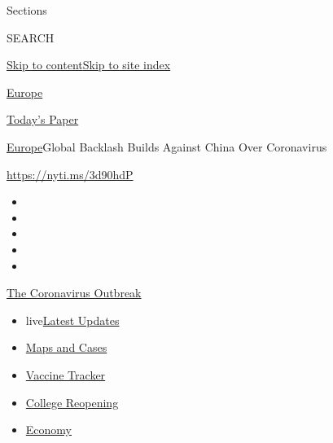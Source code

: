 Sections

SEARCH

\protect\hyperlink{site-content}{Skip to
content}\protect\hyperlink{site-index}{Skip to site index}

\href{https://www.nytimes.com/section/world/europe}{Europe}

\href{https://myaccount.nytimes.com/auth/login?response_type=cookie\&client_id=vi}{}

\href{https://www.nytimes.com/section/todayspaper}{Today's Paper}

\href{/section/world/europe}{Europe}\textbar{}Global Backlash Builds
Against China Over Coronavirus

\url{https://nyti.ms/3d90hdP}

\begin{itemize}
\item
\item
\item
\item
\item
\end{itemize}

\href{https://www.nytimes.com/news-event/coronavirus?action=click\&pgtype=Article\&state=default\&region=TOP_BANNER\&context=storylines_menu}{The
Coronavirus Outbreak}

\begin{itemize}
\tightlist
\item
  live\href{https://www.nytimes.com/2020/08/04/world/coronavirus-cases.html?action=click\&pgtype=Article\&state=default\&region=TOP_BANNER\&context=storylines_menu}{Latest
  Updates}
\item
  \href{https://www.nytimes.com/interactive/2020/us/coronavirus-us-cases.html?action=click\&pgtype=Article\&state=default\&region=TOP_BANNER\&context=storylines_menu}{Maps
  and Cases}
\item
  \href{https://www.nytimes.com/interactive/2020/science/coronavirus-vaccine-tracker.html?action=click\&pgtype=Article\&state=default\&region=TOP_BANNER\&context=storylines_menu}{Vaccine
  Tracker}
\item
  \href{https://www.nytimes.com/2020/08/02/us/covid-college-reopening.html?action=click\&pgtype=Article\&state=default\&region=TOP_BANNER\&context=storylines_menu}{College
  Reopening}
\item
  \href{https://www.nytimes.com/live/2020/08/04/business/stock-market-today-coronavirus?action=click\&pgtype=Article\&state=default\&region=TOP_BANNER\&context=storylines_menu}{Economy}
\end{itemize}

